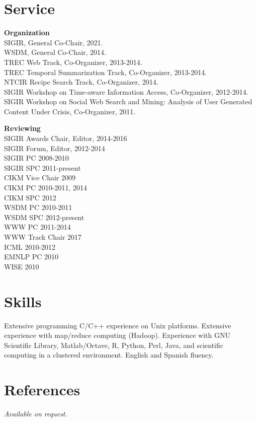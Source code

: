 \documentclass{article}
\begin{document}
\section{Service}\noindent\textbf{Organization}\\
SIGIR, General Co-Chair, 2021.\\
WSDM, General Co-Chair, 2014.\\
TREC Web Track, Co-Organizer, 2013-2014.\\
TREC Temporal Summarization Track, Co-Organizer, 2013-2014.\\
NTCIR Recipe Search Track, Co-Organizer, 2014.\\
SIGIR Workshop on Time-aware Information Access, Co-Organizer, 2012-2014.\\
SIGIR Workshop on Social Web Search and Mining: Analysis of User Generated Content Under Crisis, Co-Organizer, 2011.
	
\vspace{\baselineskip}
\noindent\textbf{Reviewing}\\
SIGIR Awards Chair, Editor, 2014-2016\\
SIGIR Forum, Editor, 2012-2014\\
SIGIR PC 2008-2010\\
SIGIR SPC 2011-present\\
CIKM Vice Chair 2009\\
CIKM PC 2010-2011, 2014\\
CIKM SPC 2012\\
WSDM PC 2010-2011\\
WSDM SPC 2012-present\\
WWW PC 2011-2014\\
WWW Track Chair 2017\\
ICML 2010-2012\\
EMNLP PC 2010\\
WISE 2010






\section{Skills}\noindent Extensive programming C/C++ experience on Unix platforms. Extensive experience with  map/reduce computing (Hadoop).  Experience with GNU Scientific Library, Matlab/Octave, R, Python, Perl, Java, and scientific computing in a clustered environment. English and Spanish fluency.



\section{References}\noindent \emph{Available on request.}

\end{document}
